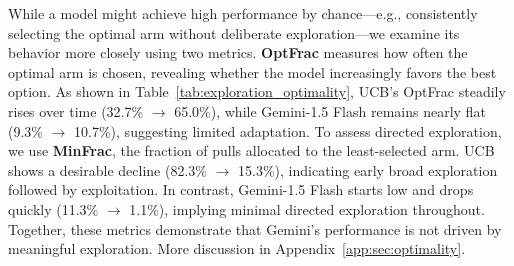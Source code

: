 \documentclass[11pt, logo]{googledeepmind}
\theoremstyle{plain}
\theoremstyle{definition}
\begin{document}
While a model might achieve high performance by chance—e.g., consistently selecting the optimal arm without deliberate exploration—we examine its behavior more closely using two metrics. \textbf{OptFrac} measures how often the optimal arm is chosen, revealing whether the model increasingly favors the best option. As shown in Table~\ref{tab:exploration_optimality}, UCB's OptFrac steadily rises over time (32.7\% $\rightarrow$ 65.0\%), while Gemini-1.5 Flash remains nearly flat (9.3\% $\rightarrow$ 10.7\%), suggesting limited adaptation. To assess directed exploration, we use \textbf{MinFrac}, the fraction of pulls allocated to the least-selected arm. UCB shows a desirable decline (82.3\% $\rightarrow$ 15.3\%), indicating early broad exploration followed by exploitation. In contrast, Gemini-1.5 Flash starts low and drops quickly (11.3\% $\rightarrow$ 1.1\%), implying minimal directed exploration throughout. Together, these metrics demonstrate that Gemini's performance is not driven by meaningful exploration. More discussion in Appendix~\ref{app:sec:optimality}.
\end{document}
